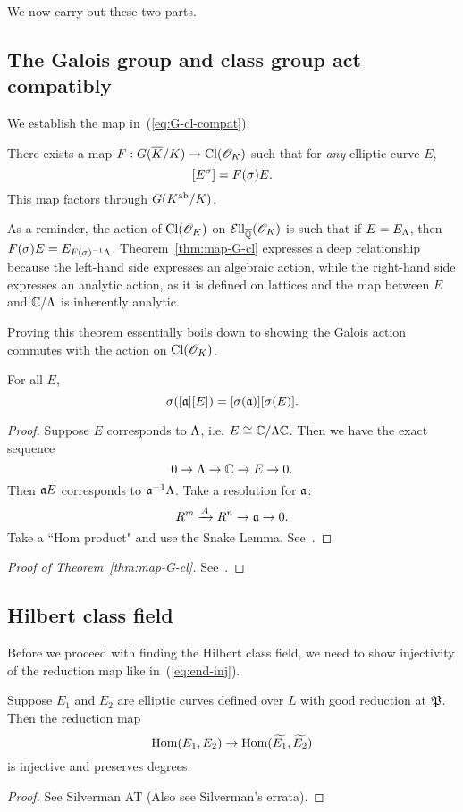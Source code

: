 We now carry out these two parts.
\subsection{The Galois group and class group act compatibly}
We establish the map in~(\ref{eq:G-cl-compat}).
\begin{thm}
There exists a map $F:G(\overline{K}/K)\to \operatorname{Cl}(\mathscr{O}_K)$ such that for {\it any} elliptic curve $E$,
\[
[E^{\sigma}]=F(\sigma)E.
\]
This map factors through $G(K^{\text{ab}}/K)$.
\end{thm}
As a reminder, the action of $\operatorname{Cl}(\mathscr{O}_K)$ on $\mathcal{E}{\rm{ll}}_{\overline{\mathbb{Q}}}(\mathscr{O}_K)$ is such that if $E=E_{\Lambda}$, then $F(\sigma)E=E_{F(\sigma)^{-1}\Lambda}$. Theorem~\ref{thm:map-G-cl} expresses a deep relationship because the left-hand side expresses an algebraic action, while the right-hand side expresses an analytic action, as it is defined on lattices and the map between $E$ and $\mathbb{C}/\Lambda$ is inherently analytic.

Proving this theorem essentially boils down to showing the Galois action commutes with the action on $\operatorname{Cl}(\mathscr{O}_K)$.
\begin{pr}
For all $E$,
\[
\sigma([\mathfrak{a}] [E])=[\sigma(\mathfrak{a})][\sigma(E)].
\]
\end{pr}
\begin{proof}
Suppose $E$ corresponds to $\Lambda$, i.e. $E\cong \mathbb{C}/\Lambda\mathbb{C}$. Then we have the exact sequence
\[
0\to \Lambda\to \mathbb{C}\to E\to 0.
\]
Then $\mathfrak{a} E$ corresponds to $\mathfrak{a}^{-1}\Lambda$. Take a resolution for $\mathfrak{a}$:
\[
R^m\xrightarrow{A} R^n\to \mathfrak{a}\to 0.
\]
Take a ``Hom product" and use the Snake Lemma. See~\cite[II.2.5]{Si94}.
\end{proof}
\begin{proof}[Proof of Theorem~\ref{thm:map-G-cl}]
See~\cite[II.2.4]{Si94}.
\end{proof}
\subsection{Hilbert class field}
Before we proceed with finding the Hilbert class field, we need to show injectivity of the reduction map like in~(\ref{eq:end-inj}).
\begin{thm}
Suppose $E_1$ and $E_2$ are elliptic curves defined over $L$ with good reduction at $\mathfrak{P}$. Then the reduction map
\[
\operatorname{Hom}(E_1,E_2)\to \operatorname{Hom}(\widetilde{E_1},\widetilde{E_2})
\]
is injective and preserves degrees.
\end{thm}
\begin{proof}
See Silverman AT \cite[pg. 124]{Si94} (Also see Silverman's errata).
\end{proof}

